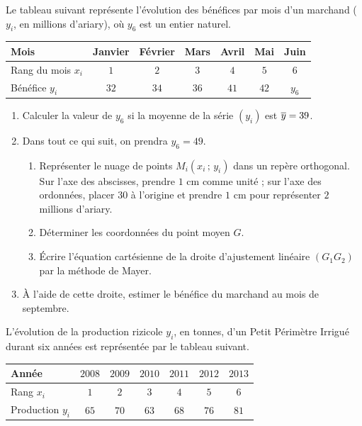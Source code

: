 \begin{annales}
Le tableau suivant représente l'évolution des bénéfices par mois d'un
marchand ($y_{i}$, en millions d'ariary), où $y_{6}$ est un entier naturel.

\begin{center}\footnotesize
\renewcommand{\arraystretch}{1.25}
\begin{tabular}{|l|c|c|c|c|c|c|}
\hline
Mois & Janvier & Février & Mars & Avril & Mai & Juin\\
\hline
Rang du mois $x_{i}$ & $1$ & $2$ & $3$ & $4$ & $5$ & $6$\\
\hline
Bénéfice $y_{i}$ & $32$ & $34$ & $36$ & $41$ & $42$ & $y_{6}$\\
\hline
\end{tabular}
\end{center}

\begin{enumerate}[label=\textbf{\arabic*)}, leftmargin=*, itemsep=0.15em]
  \item Calculer la valeur de $y_{6}$ si la moyenne de la série $(y_{i})$
        est $\overline{y} = 39$.
  \item Dans tout ce qui suit, on prendra $y_{6} = 49$.
        \begin{enumerate}[label=\textbf{\alph*)}, leftmargin=1.4em]
          \item Représenter le nuage de points $M_{i}(x_{i}\,;\,y_{i})$ dans
                un repère orthogonal. Sur l'axe des abscisses, prendre
                $1$ cm comme unité ; sur l'axe des ordonnées, placer $30$ à
                l'origine et prendre $1$ cm pour représenter $2$ millions
                d'ariary.
          \item Déterminer les coordonnées du point moyen $G$.
          \item Écrire l'équation cartésienne de la droite d'ajustement
                linéaire $\left(G_{1}G_{2}\right)$ par la méthode de Mayer.
        \end{enumerate}
  \item À l'aide de cette droite, estimer le bénéfice du marchand au mois de
        septembre.
\end{enumerate}

L'évolution de la production rizicole $y_{i}$, en tonnes, d'un Petit
Périmètre Irrigué durant six années est représentée par le tableau suivant.

\begin{center}\footnotesize
\renewcommand{\arraystretch}{1.25}
\begin{tabular}{|l|c|c|c|c|c|c|}
\hline
Année & $2008$ & $2009$ & $2010$ & $2011$ & $2012$ & $2013$\\
\hline
Rang $x_{i}$ & $1$ & $2$ & $3$ & $4$ & $5$ & $6$\\
\hline
Production $y_{i}$ & $65$ & $70$ & $63$ & $68$ & $76$ & $81$\\
\hline
\end{tabular}
\end{center}


\end{annales}
